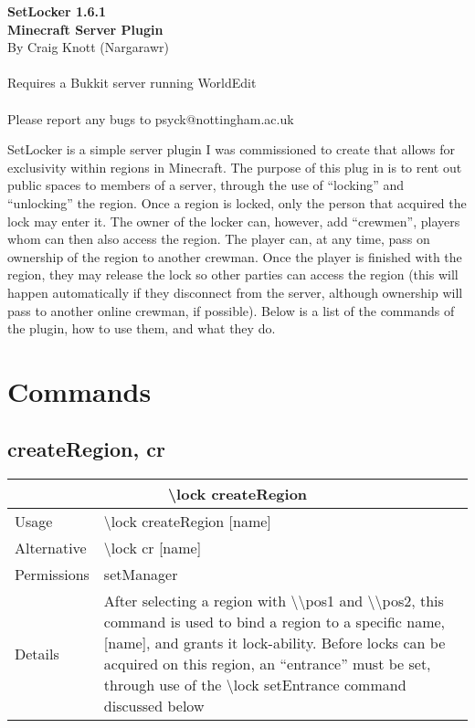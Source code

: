 \documentclass[a4paper,twoside,notitlepage,11pt]{article}
\newcommand{\nin}{\noindent}
\begin{document}
\begin{center}
   \textbf{SetLocker 1.6.1\ \\Minecraft Server Plugin} \ \\
   By Craig Knott (Nargarawr) \ \\
   \ \\
   Requires a Bukkit server running WorldEdit\ \\
   \ \\
   Please report any bugs to psyck@nottingham.ac.uk
\end{center}
\nin
SetLocker is a simple server plugin I was commissioned to create that allows for exclusivity within regions in Minecraft. The purpose of this plug in is to rent out public spaces to members of a server, through the use of ``locking'' and ``unlocking'' the region. Once a region is locked, only the person that acquired the lock may enter it. The owner of the locker can, however, add ``crewmen'', players whom can then also access the region. The player can, at any time, pass on ownership of the region to another crewman. Once the player is finished with the region, they may release the lock so other parties can access the region (this will happen automatically if they disconnect from the server, although ownership will pass to another online crewman, if possible). Below is a list of the commands of the plugin, how to use them, and what they do.

\tableofcontents

\newpage
\pagestyle{plain}

\section{Commands}
\subsection{createRegion, cr}
\begin{center}
\begin{tabular}{|p{2cm}|p{12.5cm}|} \hline
\multicolumn{2}{|c|}{\textbf{\textbackslash lock createRegion}} \\ \hline
Usage       & \textbackslash lock createRegion [name] \\ \hline
Alternative & \textbackslash lock cr [name] \\ \hline
Permissions & setManager \\ \hline
Details 	& After selecting a region with \textbackslash\textbackslash pos1 and \textbackslash\textbackslash pos2, this command is used to bind a region to a specific name, [name], and grants it lock-ability. Before locks can be acquired on this region, an ``entrance'' must be set, through use of the \textbackslash lock setEntrance command discussed below\\ \hline
\end{tabular}
\end{center}
\end{document}
